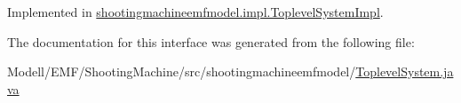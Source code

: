 Implemented in \hyperlink{classshootingmachineemfmodel_1_1impl_1_1_toplevel_system_impl_aa988e6aa9d9405ebfba8d30a9e1c7689}{shootingmachineemfmodel.\-impl.\-Toplevel\-System\-Impl}.



The documentation for this interface was generated from the following file\-:\begin{DoxyCompactItemize}
\item 
Modell/\-E\-M\-F/\-Shooting\-Machine/src/shootingmachineemfmodel/\hyperlink{_toplevel_system_8java}{Toplevel\-System.\-java}\end{DoxyCompactItemize}
